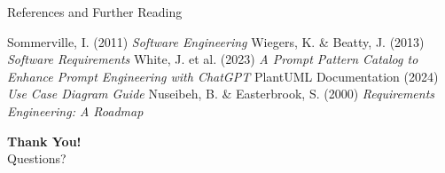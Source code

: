 \documentclass{beamer}
\begin{document}
\begin{frame}[t]{References and Further Reading}
    \begin{thebibliography}{10}
         Sommerville, I. (2011) \emph{Software Engineering}
         Wiegers, K. \& Beatty, J. (2013) \emph{Software Requirements}
         White, J. et al. (2023) \emph{A Prompt Pattern Catalog to Enhance Prompt Engineering with ChatGPT}
         PlantUML Documentation (2024) \emph{Use Case Diagram Guide}
         Nuseibeh, B. \& Easterbrook, S. (2000) \emph{Requirements Engineering: A Roadmap}
    \end{thebibliography}
    
    \begin{center}
        \textbf{Thank You!}\\
        Questions?
    \end{center}
\end{frame}
\end{document}
